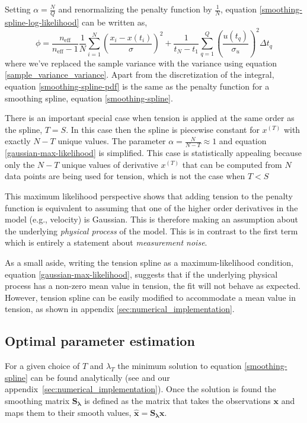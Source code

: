 \documentclass[10pt,journal]{IEEEtran}
\begin{document}
Setting $\alpha=\frac{N}{Q}$ and renormalizing the penalty function by $\frac{1}{N}$, equation \ref{smoothing-spline-log-likelihood} can be written as,
\begin{equation}
\label{smoothing-spline-pdf}
\phi =\frac{n_{\textrm{eff}}}{n_{\textrm{eff}}-1}  \frac{1}{N} \sum^N _{i=1}  \left( \frac{x_i - x(t_i)}{\sigma} \right)^2 + \frac{1}{t_N-t_1} \sum^{Q}_{q=1}  \left(  \frac{u(t_q)}{\sigma_u} \right)^2 \Delta t_q
\end{equation}
where we've replaced the sample variance with the variance using equation \ref{sample_variance_variance}.
Apart from the discretization of the integral, equation \ref{smoothing-spline-pdf} is the same as the penalty function for a smoothing spline, equation \ref{smoothing-spline}.

There is an important special case when tension is applied at the same order as the spline, $T=S$. In this case then the spline is piecewise constant for $x^{(T)}$ with exactly $N-T$ unique values. The parameter $\alpha =\frac{N}{N-T}\approx 1$ and equation \ref{gaussian-max-likelihood} is simplified. This case is statistically appealing because only the $N-T$ unique values of derivative $x^{(T)}$ that can be computed from $N$ data points are being used for tension, which is not the case when $T<S$

This maximum likelihood perspective shows that adding tension to the penalty function is equivalent to assuming that one of the higher order derivatives in the model (e.g., velocity) is Gaussian. This is therefore making an assumption about the underlying \emph{physical process} of the model. This is in contrast to the first term which is entirely a statement about \emph{measurement noise}.

As a small aside, writing the tension spline as a maximum-likelihood condition, equation \ref{gaussian-max-likelihood}, suggests that if the underlying physical process has a non-zero mean value in tension, the fit will not behave as expected. However, tension spline can be easily modified to accommodate a mean value in tension, as shown in appendix \ref{sec:numerical_implementation}. 

\subsection{Optimal parameter estimation} \label{sec:optimal_parameter}

For a given choice of $T$ and $\lambda_T$ the minimum solution to equation \ref{smoothing-spline} can be found analytically (see \cite{teanby2007-mg} and our appendix~\ref{sec:numerical_implementation}). Once the solution is found the smoothing matrix $\mathbf{S_\lambda}$ is defined as the matrix that takes the observations $\mathbf{x}$ and maps them to their smooth values, $\mathbf{\hat{x}} = \mathbf{S_\lambda} \mathbf{x}$.
\end{document}
